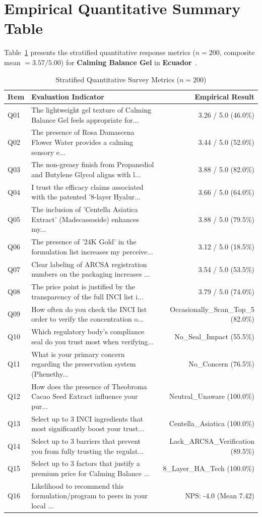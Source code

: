 \documentclass[10pt,twocolumn,a4paper]{article}
\begin{document}
\section{Empirical Quantitative Summary Table}
Table~\ref{tab:metrics} presents the stratified quantitative response metrics ($n = 200$, composite mean $= 3.57/5.00$) for \textbf{Calming Balance Gel} in \textbf{Ecuador}~\cite{ref_kaggle_doi,ref_hf_doi}.

\begin{table}[t]
\centering
\caption{Stratified Quantitative Survey Metrics ($n = 200$)}
\label{tab:metrics}
\small
\begin{tabularx}{\textwidth}{l X r}
\toprule
\textbf{Item} & \textbf{Evaluation Indicator} & \textbf{Empirical Result} \\
\midrule
Q01 & The lightweight gel texture of Calming Balance Gel feels appropriate for... & 3.26 / 5.0 (46.0\%) \\
Q02 & The presence of Rosa Damascena Flower Water provides a calming sensory e... & 3.44 / 5.0 (52.0\%) \\
Q03 & The non-greasy finish from Propanediol and Butylene Glycol aligns with l... & 3.88 / 5.0 (82.0\%) \\
Q04 & I trust the efficacy claims associated with the patented '8-layer Hyalur... & 3.66 / 5.0 (64.0\%) \\
Q05 & The inclusion of 'Centella Asiatica Extract' (Madecassoside) enhances my... & 3.88 / 5.0 (79.5\%) \\
Q06 & The presence of '24K Gold' in the formulation list increases my perceive... & 3.12 / 5.0 (18.5\%) \\
Q07 & Clear labeling of ARCSA registration numbers on the packaging increases ... & 3.54 / 5.0 (53.5\%) \\
Q08 & The price point is justified by the transparency of the full INCI list i... & 3.79 / 5.0 (74.0\%) \\
Q09 & How often do you check the INCI list order to verify the concentration o... & Occasionally\_Scan\_Top\_5 (82.0\%) \\
Q10 & Which regulatory body's compliance seal do you trust most when verifying... & No\_Seal\_Impact (55.5\%) \\
Q11 & What is your primary concern regarding the preservation system (Phenethy... & No\_Concern (76.5\%) \\
Q12 & How does the presence of Theobroma Cacao Seed Extract influence your pur... & Neutral\_Unaware (100.0\%) \\
Q13 & Select up to 3 INCI ingredients that most significantly boost your trust... & Centella\_Asiatica (100.0\%) \\
Q14 & Select up to 3 barriers that prevent you from fully trusting the regulat... & Lack\_ARCSA\_Verification (89.5\%) \\
Q15 & Select up to 3 factors that justify a premium price for Calming Balance ... & 8\_Layer\_HA\_Tech (100.0\%) \\
Q16 & Likelihood to recommend this formulation/program to peers in your local ... & NPS: -4.0 (Mean 7.42) \\
\bottomrule
\end{tabularx}
\end{table}
\end{document}
